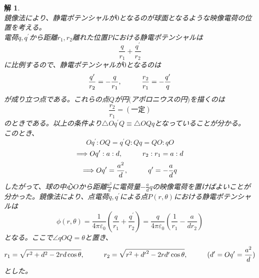 \documentclass{jsarticle}
\newtheorem{ans}{解}[section]
\begin{document}
\begin{ans}~\\
鏡像法により、静電ポテンシャルが\(0\)となるのが球面となるような映像電荷の位置を考える。\\
電荷\(q,q^{\prime}\)から距離\(r_{1},r_{2}\)離れた位置\(P\)における静電ポテンシャルは
\[\frac{q}{r_{1}}+\frac{q^{\prime}}{r_{2}}\]
に比例するので、静電ポテンシャルが\(0\)となるのは
\[\frac{q^{\prime}}{r_{2}}=-\frac{q}{r_{1}},\hspace{10mm}\frac{r_{2}}{r_{1}}=-\frac{q^{\prime}}{q}\]
が成り立つ点である。これらの点\(Q\)が円\((\)アポロニウスの円\()\)を描くのは
\[\frac{r_{2}}{r_{1}}=(一定)\]
のときである。以上の条件より\(\triangle{Oq^{\prime}Q}\equiv\triangle{OQq}\)となっていることが分かる。\\
このとき、
\[Oq^{\prime}:OQ=q^{\prime}Q:Qq=QO:qO\]
\[\Longrightarrow Oq^{\prime}:a:d,\hspace{10mm}r_{2}:r_{1}=a:d\]
\[\Longrightarrow Oq^{\prime}=\frac{a^{2}}{d},\hspace{10mm}q^{\prime}=-\frac{a}{d}q\]
したがって、球の中心\(O\)から距離\(\frac{a^2}{d}\)に電荷量\(-\frac{a}{d}q\)の映像電荷を置けばよいことが分かった。鏡像法により、点電荷\(q,q^{\prime}\)による点\(P(r,\theta)\)における静電ポテンシャルは
\[\phi(r,\theta)=\frac{1}{4\pi\varepsilon_{0}}\left(\frac{q}{r_{1}}+\frac{q^{\prime}}{r_{2}}\right)=\frac{q}{4\pi\varepsilon_{0}}\left(\frac{1}{r_{1}}-\frac{a}{dr_{2}}\right)\]
となる。ここで\(\angle qOQ=\theta\)と置き、
\[r_{1}=\sqrt{r^{2}+d^{2}-2rd\cos\theta},\hspace{10mm}r_{2}=\sqrt{r^{2}+{d^{\prime}}^{2}-2rd^{\prime}\cos\theta},\hspace{10mm}(d^{\prime}=Oq^{\prime}=\frac{a^2}{d})\]
とした。
\end{ans}
\end{document}
